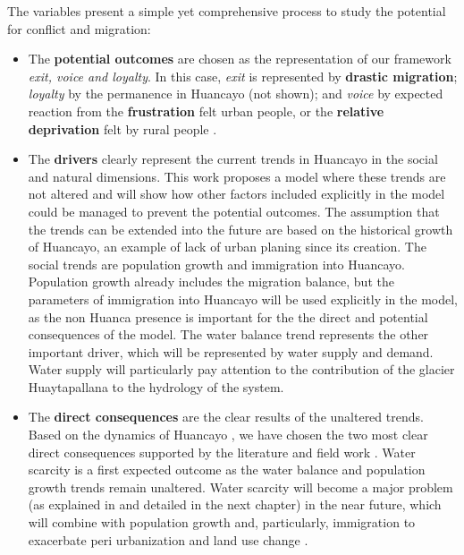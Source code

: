 \documentclass{article}
\begin{document}
The variables present a simple yet comprehensive process to study the potential for conflict and migration:
\begin{itemize}
\item The {\bf potential outcomes} are chosen as the representation of our framework \emph{exit, voice and loyalty}\cite{hirschman_exit_1970}. In this case, \emph{exit} is represented by {\bf drastic migration}; \emph{loyalty} by the permanence in Huancayo (not shown); and \emph{voice} by expected reaction from the {\bf frustration} felt urban people, or the {\bf relative deprivation} felt by rural people . 

\item The {\bf drivers} clearly represent the current trends in Huancayo  in the social and natural dimensions. This work proposes a model where these trends are not altered and will show how other factors included explicitly in the model could be managed to prevent the potential outcomes. The assumption that the trends can be extended into the future are based on the historical growth of Huancayo, an example of lack of urban planing since its creation. The social trends are population growth and immigration into Huancayo. Population growth already includes the migration balance, but the parameters of immigration into Huancayo will be used explicitly in the model, as the non Huanca presence is important for the the direct and potential consequences of the model. The water balance trend represents the other important driver, which will be represented by water supply and demand. Water supply will particularly pay attention to the contribution of the glacier Huaytapallana to the hydrology of the system. 

\item The {\bf direct consequences} are the clear results of the unaltered trends. Based on the dynamics of Huancayo , we have chosen the two most clear direct consequences supported by the literature and field work \cite{haller_huancayo_2013,ho_2012,haller_vivid_2012}. Water scarcity is a first expected outcome as the water balance and population growth trends remain unaltered. Water scarcity will become a major problem (as explained in \cite{carlos_riesgos_2012} and detailed in the next chapter) in the near future, which will combine with population growth and, particularly, immigration to exacerbate peri urbanization and land use change \cite{haller_huancayo_2013,haller_vivid_2012,ho_2012}. 


\end{itemize}
\end{document}
